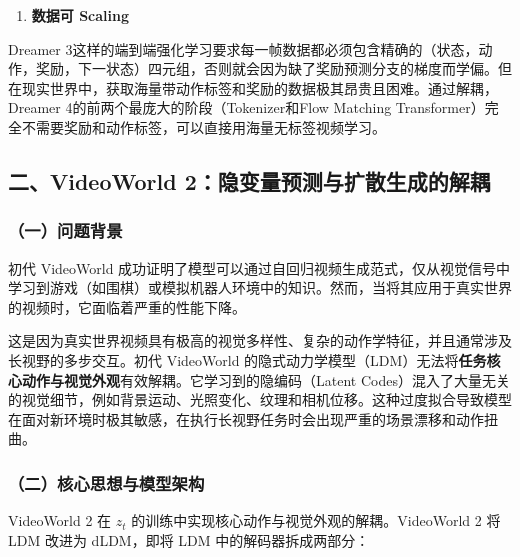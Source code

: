 \begin{enumerate}
\def\labelenumi{\arabic{enumi}.}
\setcounter{enumi}{1}
\tightlist
\item
  \textbf{数据可 Scaling}
\end{enumerate}

Dreamer 3这样的端到端强化学习要求每一帧数据都必须包含精确的（状态，动作，奖励，下一状态）四元组，否则就会因为缺了奖励预测分支的梯度而学偏。但在现实世界中，获取海量带动作标签和奖励的数据极其昂贵且困难。通过解耦，Dreamer 4的前两个最庞大的阶段（Tokenizer和Flow Matching Transformer）完全不需要奖励和动作标签，可以直接用海量无标签视频学习。

\hypertarget{ux4e8cvideoworld-2ux9690ux53d8ux91cfux9884ux6d4bux4e0eux6269ux6563ux751fux6210ux7684ux89e3ux8026}{%
\subsection{二、VideoWorld 2：隐变量预测与扩散生成的解耦}\label{ux4e8cvideoworld-2ux9690ux53d8ux91cfux9884ux6d4bux4e0eux6269ux6563ux751fux6210ux7684ux89e3ux8026}}

\hypertarget{ux4e00ux95eeux9898ux80ccux666f-11}{%
\subsubsection{（一）问题背景}\label{ux4e00ux95eeux9898ux80ccux666f-11}}

初代 VideoWorld 成功证明了模型可以通过自回归视频生成范式，仅从视觉信号中学习到游戏（如围棋）或模拟机器人环境中的知识。然而，当将其应用于真实世界的视频时，它面临着严重的性能下降。

这是因为真实世界视频具有极高的视觉多样性、复杂的动作学特征，并且通常涉及长视野的多步交互。初代 VideoWorld 的隐式动力学模型（LDM）无法将\textbf{任务核心动作与视觉外观}有效解耦。它学习到的隐编码（Latent Codes）混入了大量无关的视觉细节，例如背景运动、光照变化、纹理和相机位移。这种过度拟合导致模型在面对新环境时极其敏感，在执行长视野任务时会出现严重的场景漂移和动作扭曲。

\hypertarget{ux4e8cux6838ux5fc3ux601dux60f3ux4e0eux6a21ux578bux67b6ux6784}{%
\subsubsection{（二）核心思想与模型架构}\label{ux4e8cux6838ux5fc3ux601dux60f3ux4e0eux6a21ux578bux67b6ux6784}}

VideoWorld 2 在 \(z_t\) 的训练中实现核心动作与视觉外观的解耦。VideoWorld 2 将 LDM 改进为 dLDM，即将 LDM 中的解码器拆成两部分：

